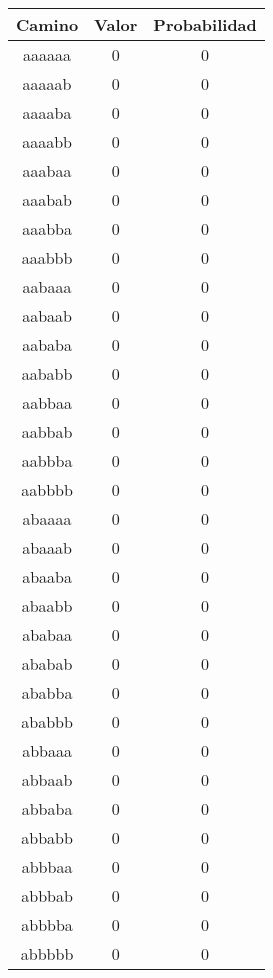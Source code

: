 \begin{figure}[hbpt]
\begin{minipage}{0.48\textwidth}
\begin{center}
\begin{tabular}{|c|c|c|}
\hline
\textbf{Camino} & \textbf{Valor} & \textbf{Probabilidad} \\
\hline
aaaaaa  & 0 & 0 \\
aaaaab  & 0 & 0 \\
aaaaba  & 0 & 0 \\
aaaabb  & 0 & 0 \\
aaabaa  & 0 & 0 \\
aaabab  & 0 & 0 \\
aaabba  & 0 & 0 \\
aaabbb  & 0 & 0 \\
aabaaa  & 0 & 0 \\
aabaab  & 0 & 0 \\
aababa  & 0 & 0 \\
aababb  & 0 & 0 \\
aabbaa  & 0 & 0 \\
aabbab  & 0 & 0 \\
aabbba  & 0 & 0 \\
aabbbb  & 0 & 0 \\
abaaaa  & 0 & 0 \\
abaaab  & 0 & 0 \\
abaaba  & 0 & 0 \\
abaabb  & 0 & 0 \\
ababaa  & 0 & 0 \\
ababab  & 0 & 0 \\
ababba  & 0 & 0 \\
ababbb  & 0 & 0 \\
abbaaa  & 0 & 0 \\
abbaab  & 0 & 0 \\
abbaba  & 0 & 0 \\
abbabb  & 0 & 0 \\
abbbaa  & 0 & 0 \\
abbbab  & 0 & 0 \\
abbbba  & 0 & 0 \\
abbbbb  & 0 & 0 \\
\hline
\end{tabular}
\end{center}
\end{minipage}
\begin{minipage}{0.48\textwidth}
\begin{center}
\begin{tabular}{|c|c|c|}

\end{tabular}
\end{center}
\end{minipage}
\end{figure}
